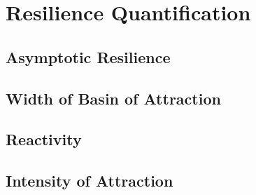 \section{Resilience Quantification}
\label{sec:resilience}

\subsection{Asymptotic Resilience}

\subsection{Width of Basin of Attraction}

\subsection{Reactivity}

\subsection{Intensity of Attraction}